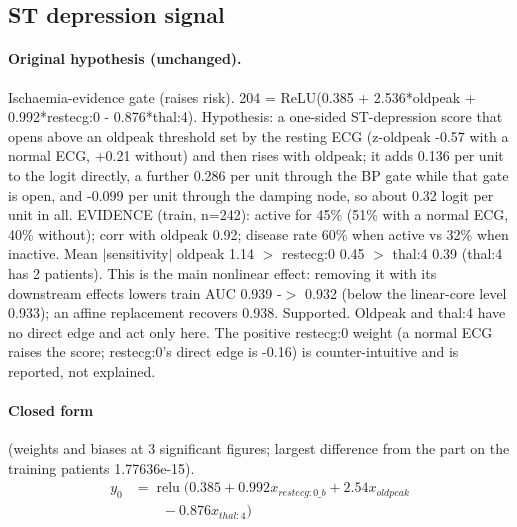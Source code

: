 \documentclass[a4paper,10pt]{article}
\newif\ifreviewmarks
\newcommand{\reviewrule}{\noindent{\color{BrickRed}\rule{\linewidth}{0.8pt}}}
\newenvironment{drafted}[1][]{%
  \ifreviewmarks\par\addvspace{\medskipamount}\reviewrule\par\nopagebreak
  \noindent{\color{BrickRed}\sffamily\footnotesize\textbf{Thesis Draft}\quad #1\hfill review}\par\nopagebreak\smallskip\fi}{%
  \ifreviewmarks\par\smallskip\noindent{\color{BrickRed}\sffamily\footnotesize end of thesis draft}\par\nopagebreak\reviewrule\par\medskip\fi}
\begin{document}
\begin{drafted}[plain-language layer: heart-s5-c2]
\subsection{ST depression signal}\label{tech:ann33}
\paragraph{Original hypothesis (unchanged).} Ischaemia-evidence gate (raises risk). 204 = ReLU(0.385 + 2.536*oldpeak + 0.992*restecg:0 - 0.876*thal:4). Hypothesis: a one-sided ST-depression score that opens above an oldpeak threshold set by the resting ECG (z-oldpeak -0.57 with a normal ECG, +0.21 without) and then rises with oldpeak; it adds 0.136 per unit to the logit directly, a further 0.286 per unit through the BP gate while that gate is open, and -0.099 per unit through the damping node, so about 0.32 logit per unit in all. EVIDENCE (train, n=242): active for 45\% (51\% with a normal ECG, 40\% without); corr with oldpeak 0.92; disease rate 60\% when active vs 32\% when inactive. Mean $|$sensitivity$|$ oldpeak 1.14 $>$ restecg:0 0.45 $>$ thal:4 0.39 (thal:4 has 2 patients). This is the main nonlinear effect: removing it with its downstream effects lowers train AUC 0.939 -$>$ 0.932 (below the linear-core level 0.933); an affine replacement recovers 0.938. Supported. Oldpeak and thal:4 have no direct edge and act only here. The positive restecg:0 weight (a normal ECG raises the score; restecg:0's direct edge is -0.16) is counter-intuitive and is reported, not explained.
\paragraph{Closed form} {\footnotesize(weights and biases at 3 significant figures; largest difference from the part on the training patients 1.77636e-15).}
{\small\begingroup\allowdisplaybreaks
\begin{align*}
y_{0} &= \operatorname{relu}\bigl(0.385 + 0.992 x_{restecg:0\_b} + 2.54 x_{oldpeak} \\
&\qquad - 0.876 x_{thal:4}\bigr)
\end{align*}\endgroup}


\end{drafted}
\end{document}
